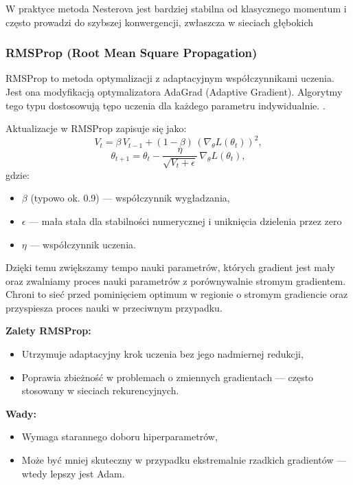 W praktyce metoda Nesterova jest bardziej stabilna od klasycznego momentum i często prowadzi do szybszej konwergencji, zwłaszcza w sieciach głębokich

\subsubsection*{RMSProp (Root Mean Square Propagation)}

RMSProp to metoda optymalizacji z adaptacyjnym współczynnikami uczenia. Jest ona modyfikacją optymalizatora AdaGrad (Adaptive Gradient).
Algorytmy tego typu dostosowują tępo uczenia dla każdego parametru indywidualnie. 
\cite{Hinton2012}.

Aktualizacje w RMSProp zapisuje się jako:
\[
V_t = \beta\, V_{t-1} + (1-\beta)\, (\nabla_{\theta} L(\theta_t))^2,
\]
\[
\theta_{t+1} = \theta_t - \frac{\eta}{\sqrt{V_t + \epsilon}}\, \nabla_{\theta} L(\theta_t),
\]
gdzie:
\begin{itemize}
	\item $\beta$ (typowo ok. 0.9) — współczynnik wygładzania,
	\item $\epsilon$ — mała stała dla stabilności numerycznej i uniknięcia dzielenia przez zero
	\item $\eta$ — współczynnik uczenia.
\end{itemize}

Dzięki temu zwiększamy tempo nauki parametrów, których gradient jest mały oraz zwalniamy proces nauki parametrów z porównywalnie stromym gradientem. Chroni to sieć przed pominięciem optimum w regionie o stromym gradiencie oraz przyspiesza proces nauki w przeciwnym przypadku.

\textbf{Zalety RMSProp:}
\begin{itemize}
	\item Utrzymuje adaptacyjny krok uczenia bez jego nadmiernej redukcji,
	\item Poprawia zbieżność w problemach o zmiennych gradientach — często stosowany w sieciach rekurencyjnych.
\end{itemize}

\textbf{Wady:}
\begin{itemize}
	\item Wymaga starannego doboru hiperparametrów,
	\item Może być mniej skuteczny w przypadku ekstremalnie rzadkich gradientów — wtedy lepszy jest Adam.
\end{itemize}



